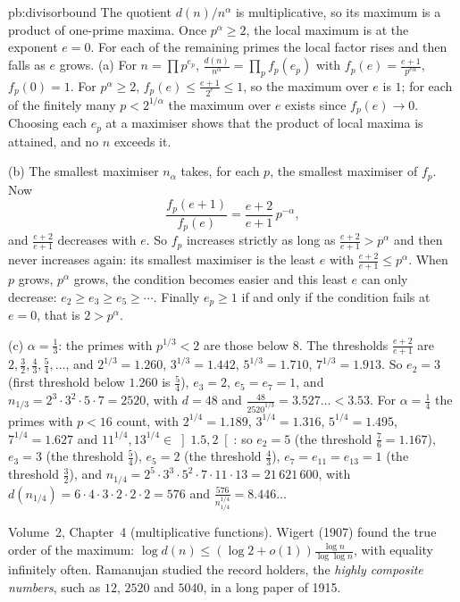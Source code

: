 \begin{solution}{pb:divisorbound}
\idea The quotient $d(n)/n^\alpha$ is multiplicative, so its maximum is a product of one-prime maxima. Once $p^\alpha\ge2$, the local maximum is at the exponent $e=0$. For each of the remaining primes the local factor rises and then falls as $e$ grows.
\writeup (a) For $n=\prod p^{e_p}$, $\frac{d(n)}{n^\alpha}=\prod_pf_p(e_p)$ with $f_p(e)=\frac{e+1}{p^{e\alpha}}$, $f_p(0)=1$. For $p^\alpha\ge2$, $f_p(e)\le\frac{e+1}{2^e}\le1$,
so the maximum over $e$ is $1$; for each of the finitely many $p<2^{1/\alpha}$ the maximum over $e$ exists since $f_p(e)\to0$. Choosing each $e_p$ at
a maximiser shows that the product of local maxima is attained, and no $n$ exceeds it.

(b) The smallest maximiser $n_\alpha$ takes, for each $p$, the smallest maximiser of $f_p$. Now
\[
\frac{f_p(e+1)}{f_p(e)}=\frac{e+2}{e+1}\,p^{-\alpha},
\]
and $\frac{e+2}{e+1}$ decreases with $e$. So $f_p$ increases strictly as long as $\frac{e+2}{e+1}>p^\alpha$ and then never increases again: its
smallest maximiser is the least $e$ with $\frac{e+2}{e+1}\le p^\alpha$. When $p$ grows, $p^\alpha$ grows, the condition becomes easier and
this least $e$ can only decrease: $e_2\ge e_3\ge e_5\ge\cdots$. Finally $e_p\ge1$ if and only if the condition fails at $e=0$, that is $2>p^\alpha$.

(c) $\alpha=\frac13$: the primes with $p^{1/3}<2$ are those below $8$. The thresholds $\frac{e+2}{e+1}$ are $2,\frac32,\frac43,\frac54,\dots$, and
$2^{1/3}=1.260$, $3^{1/3}=1.442$, $5^{1/3}=1.710$, $7^{1/3}=1.913$. So $e_2=3$ (first threshold below $1.260$ is $\frac54$), $e_3=2$, $e_5=e_7=1$, and
$n_{1/3}=2^3\cdot3^2\cdot5\cdot7=2520$, with $d=48$ and $\frac{48}{2520^{1/3}}=3.527\ldots<3.53$.
For $\alpha=\frac14$ the primes with $p<16$ count, with $2^{1/4}=1.189$, $3^{1/4}=1.316$, $5^{1/4}=1.495$, $7^{1/4}=1.627$ and
$11^{1/4},13^{1/4}\in\left]1.5,2\right[$: so $e_2=5$ (the threshold $\frac76=1.167$), $e_3=3$ (the threshold $\frac54$), $e_5=2$ (the
threshold $\frac43$), $e_7=e_{11}=e_{13}=1$ (the threshold $\frac32$), and $n_{1/4}=2^5\cdot3^3\cdot5^2\cdot7\cdot11\cdot13=21\,621\,600$, with
$d(n_{1/4})=6\cdot4\cdot3\cdot2\cdot2\cdot2=576$ and $\frac{576}{n_{1/4}^{1/4}}=8.446\ldots$

\tools Volume~2, Chapter~4 (multiplicative functions).
\leads Wigert (1907) found the true order of the maximum: $\log d(n)\le(\log2+o(1))\frac{\log n}{\log\log n}$, with equality infinitely often.
Ramanujan studied the record holders, the \emph{highly composite numbers}, such as $12$, $2520$ and $5040$, in a long paper of 1915.
\end{solution}

